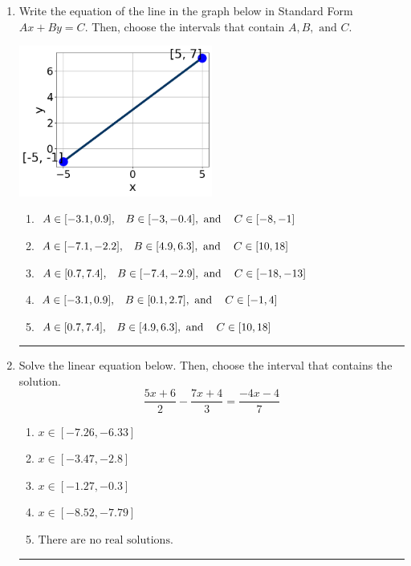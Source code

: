 \documentclass[14pt]{extbook}
\newcommand{\litem}[1]{\item#1\hspace*{-1cm}\rule{\textwidth}{0.4pt}}
\begin{document}
\begin{enumerate}
{\begin{enumerate}[label=\Alph*.]
\end{enumerate} }
\litem{
Write the equation of the line in the graph below in Standard Form $Ax+By=C$. Then, choose the intervals that contain $A, B, \text{ and } C$.
\begin{center}
    \includegraphics[width=0.5\textwidth]{../Figures/linearGraphToStandardB.png}
\end{center}
\begin{enumerate}[label=\Alph*.]
\item \( A \in [-3.1, 0.9], \hspace{3mm} B \in [-3, -0.4], \text{ and } \hspace{3mm} C \in [-8, -1] \)
\item \( A \in [-7.1, -2.2], \hspace{3mm} B \in [4.9, 6.3], \text{ and } \hspace{3mm} C \in [10, 18] \)
\item \( A \in [0.7, 7.4], \hspace{3mm} B \in [-7.4, -2.9], \text{ and } \hspace{3mm} C \in [-18, -13] \)
\item \( A \in [-3.1, 0.9], \hspace{3mm} B \in [0.1, 2.7], \text{ and } \hspace{3mm} C \in [-1, 4] \)
\item \( A \in [0.7, 7.4], \hspace{3mm} B \in [4.9, 6.3], \text{ and } \hspace{3mm} C \in [10, 18] \)

\end{enumerate} }
\litem{
Solve the linear equation below. Then, choose the interval that contains the solution.\[ \frac{5x + 6}{2} - \frac{7x + 4}{3} = \frac{-4x -4}{7} \]\begin{enumerate}[label=\Alph*.]
\item \( x \in [-7.26, -6.33] \)
\item \( x \in [-3.47, -2.8] \)
\item \( x \in [-1.27, -0.3] \)
\item \( x \in [-8.52, -7.79] \)
\item \( \text{There are no real solutions.} \)


\end{enumerate}}
\end{enumerate}
\end{document}
